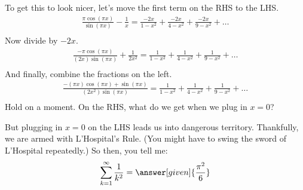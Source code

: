 \documentclass{ximera}
\begin{document}
\begin{exercise}
	To get this to look nicer, let's move the first term on the RHS to the LHS.
	\begin{align*}
		\frac{\pi \cos(\pi x)}{\sin(\pi x)} -\frac{1}{x}= \frac{-2x}{1-x^2}+\frac{-2x}{4-x^2}+\frac{-2x}{9-x^2}+\ldots \\	
	\end{align*}
	Now divide by $-2x$.
	\begin{align*}
		\frac{-\pi \cos(\pi x)}{(2x) \sin(\pi x)} +\frac{1}{2x^2}= \frac{1}{1-x^2}+\frac{1}{4-x^2}+\frac{1}{9-x^2}+\ldots \\	
	\end{align*}
	And finally, combine the fractions on the left.
	\begin{align*}
		\frac{- (\pi x) \cos(\pi x )+\sin(\pi x)}{(2x^2)\sin(\pi x)}= \frac{1}{1-x^2}+\frac{1}{4-x^2}+\frac{1}{9-x^2}+\ldots \\	
	\end{align*}
	Hold on a moment. On the RHS, what do we get when we plug in $x=0$?
	\begin{multipleChoice}
	\end{multipleChoice}
	But plugging in $x=0$ on the LHS leads us into dangerous territory. Thankfully, we are armed with L'Hospital's Rule. (You might have to swing the sword of L'Hospital repeatedly.) So then, you tell me:
	\begin{align*}
		\sum_{k=1}^{\infty} \frac{1}{k^2} = \answer[given]{\frac{\pi^2}{6}}	
	\end{align*}
\end{exercise}
\end{document}
